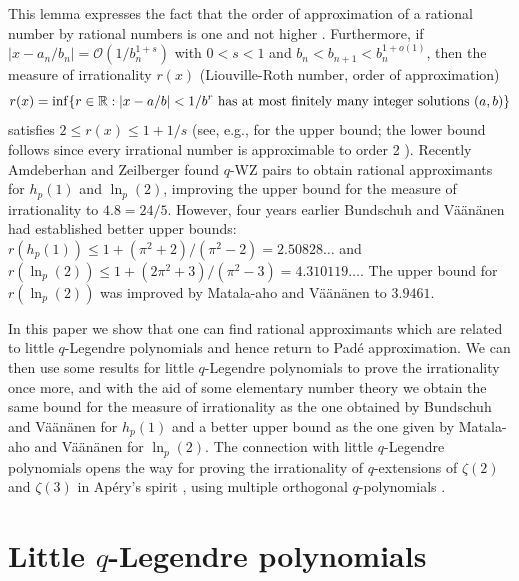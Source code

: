 \documentclass[12pt]{article}
\begin{document}
This lemma expresses the fact that the order of approximation of a
rational number by rational numbers is one and not higher \cite[Theorem 186]{HW}.
Furthermore,
if $|x-a_n/b_n| = \mathcal{O}(1/b_n^{1+s})$ with $0 < s < 1$
and $b_n < b_{n+1} < b_n^{1+o(1)}$, then the
measure of irrationality $r(x)$ (Liouville-Roth number, order of approximation)
\[ r(x) = \inf \{ r \in \mathbb{R}: |x-a/b| < 1/b^r \textrm{\ has\ at\ most\
 finitely\ many\ integer\ solutions\ } (a,b) \} \]
 satisfies
$2 \leq r(x) \leq 1+1/s$ (see, e.g., \cite[exercise 3 on p.~376]{BB}
for the upper bound; the lower bound follows since every irrational number is approximable
to order 2 \cite[Theorem 187]{HW}).   Recently Amdeberhan and Zeilberger
\cite{WZ} found $q$-WZ pairs to obtain rational approximants
for $h_p(1)$ and $\ln_p(2)$, improving the upper bound
for the measure of irrationality to $4.8 = 24/5$. However,
four years earlier Bundschuh and V\"a\"an\"anen \cite[p.~178]{BV}
had established better upper bounds: $r(h_p(1)) \leq 1+(\pi^2+2)/(\pi^2-2)
=2.50828\ldots$ and $r(\ln_p(2)) \leq 1+(2\pi^2+3)/(\pi^2-3)=4.310119\ldots$.
The upper bound for $r(\ln_p(2))$ was improved by Matala-aho and
V\"a\"an\"anen \cite{MV} to $3.9461$. 



In this paper
we show that one can find rational approximants which are related to
little $q$-Legendre polynomials and hence return to Pad\'e approximation.
We can then use some results for little $q$-Legendre polynomials
to prove the irrationality once more, and with the aid of some
elementary number theory we obtain the same bound for the measure
of irrationality as the one obtained by Bundschuh and V\"a\"an\"anen
for $h_p(1)$ and a better upper bound as the one given by Matala-aho 
and V\"a\"an\"anen for $\ln_p(2)$.
The connection with little $q$-Legendre polynomials opens the
way for proving the irrationality of $q$-extensions of
$\zeta(2)$ and $\zeta(3)$ in Ap\'ery's spirit \cite{apery},
 using multiple orthogonal $q$-polynomials \cite{wva}.
  
\section{Little $q$-Legendre polynomials}
\end{document}
